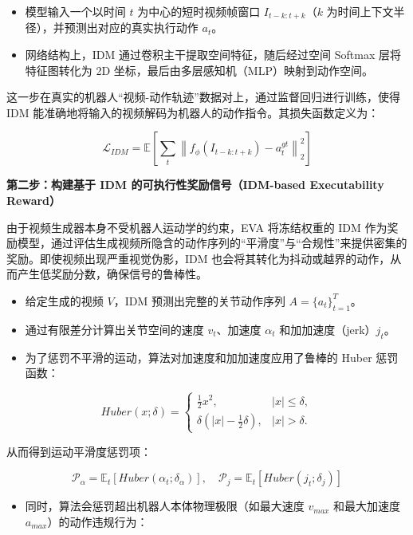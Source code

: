 \begin{itemize}
\tightlist
\item
  模型输入一个以时间 \(t\) 为中心的短时视频帧窗口 \(I_{t-k:t+k}\)（\(k\) 为时间上下文半径），并预测出对应的真实执行动作 \(a_t\)。
\item
  网络结构上，IDM 通过卷积主干提取空间特征，随后经过空间 Softmax 层将特征图转化为 2D 坐标，最后由多层感知机（MLP）映射到动作空间。
\end{itemize}

这一步在真实的机器人``视频-动作轨迹''数据对上，通过监督回归进行训练，使得 IDM 能准确地将输入的视频解码为机器人的动作指令。其损失函数定义为：

\[
\mathcal{L}_{IDM} = \mathbb{E}\left[\sum_t \left\| f_{\phi}(I_{t-k:t+k}) - a_t^{gt} \right\|_2^2\right]
\]

\textbf{第二步：构建基于 IDM 的可执行性奖励信号（IDM-based Executability Reward）}

由于视频生成器本身不受机器人运动学的约束，EVA 将冻结权重的 IDM 作为奖励模型，通过评估生成视频所隐含的动作序列的``平滑度''与``合规性''来提供密集的奖励。即使视频出现严重视觉伪影，IDM 也会将其转化为抖动或越界的动作，从而产生低奖励分数，确保信号的鲁棒性。

\begin{itemize}
\tightlist
\item
  给定生成的视频 \(V\)，IDM 预测出完整的关节动作序列 \(A = \{a_t\}_{t=1}^{T}\)。
\item
  通过有限差分计算出关节空间的速度 \(v_t\)、加速度 \(\alpha_t\) 和加加速度（jerk）\(j_t\)。
\item
  为了惩罚不平滑的运动，算法对加速度和加加速度应用了鲁棒的 Huber 惩罚函数：
\end{itemize}

\[
Huber(x;\delta)=
\begin{cases}
\frac{1}{2}x^2, & |x| \le \delta,\\
\delta\left(|x|-\frac{1}{2}\delta\right), & |x| > \delta.
\end{cases}
\]

从而得到运动平滑度惩罚项：

\[
\mathcal{P}_{\alpha} = \mathbb{E}_t[Huber(\alpha_t;\delta_{\alpha})], \quad
\mathcal{P}_{j} = \mathbb{E}_t[Huber(j_t;\delta_j)]
\]

\begin{itemize}
\tightlist
\item
  同时，算法会惩罚超出机器人本体物理极限（如最大速度 \(v_{max}\) 和最大加速度 \(a_{max}\)）的动作违规行为：
\end{itemize}

